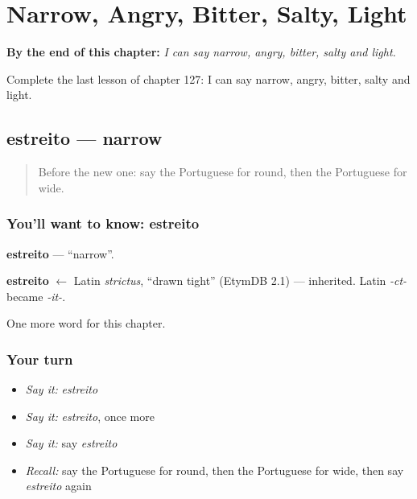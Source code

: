 
\chapter{Narrow, Angry, Bitter, Salty, Light}
\label{ch:pt-narrow-angry-bitter-salty-light}

\begin{chapteropening}
\textbf{By the end of this chapter:} \emph{I can say narrow, angry, bitter, salty and light.}

Complete the last lesson of chapter 127: I can say narrow, angry, bitter, salty and light.
\end{chapteropening}

\section[estreito]{estreito — narrow}

\label{lesson:PT-C127-estreito}



\begin{quote}
Before the new one: say the Portuguese for round, then the Portuguese for wide.
\end{quote}

\subsection*{You'll want to know: estreito}
\textbf{estreito} — \textquotedblleft{}narrow\textquotedblright{}.

\begin{cousinweb}
\textbf{estreito} $\leftarrow$ Latin \emph{strictus}, \textquotedblleft{}drawn tight\textquotedblright{} (EtymDB 2.1) — inherited. Latin \emph{-ct-} became \emph{-it-}.
\end{cousinweb}

\begin{grammarlens}[title={What you've built}]
One more word for this chapter.
\end{grammarlens}

\subsection*{Your turn}
\begin{itemize}
\raggedright
  \item \emph{Say it:} \emph{estreito}
  \item \emph{Say it:} \emph{estreito}, once more
  \item \emph{Say it:} say \emph{estreito}
  \item \emph{Recall:} say the Portuguese for round, then the Portuguese for wide, then say \emph{estreito} again
\end{itemize}


